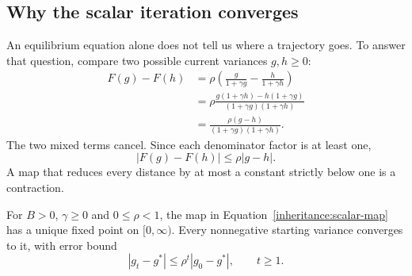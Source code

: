\subsection{Why the scalar iteration converges}
\label{inheritance:contraction}

An equilibrium equation alone does not tell us where a trajectory goes.
To answer that question, compare two possible current variances $g,h\geq0$:
\begin{align}
  F(g)-F(h)
    &=\rho\left(\frac{g}{1+\gamma g}
                      -\frac{h}{1+\gamma h}\right)\\
    &=\rho\frac{g(1+\gamma h)-h(1+\gamma g)}
                    {(1+\gamma g)(1+\gamma h)}\\
    &=\frac{\rho(g-h)}{(1+\gamma g)(1+\gamma h)}.
\end{align}
The two mixed terms cancel. Since each denominator factor is at least
one,
\begin{equation}
  |F(g)-F(h)|\leq\rho|g-h|.
  \label{inheritance:contraction-bound}
\end{equation}
A map that reduces every distance by at most a constant strictly below
one is a contraction.

\begin{proposition}
  \label{inheritance:scalar-convergence}
  For $B>0$, $\gamma\geq0$ and $0\leq\rho<1$, the map in
  Equation~\eqref{inheritance:scalar-map} has a unique fixed point on
  $[0,\infty)$. Every nonnegative starting variance converges to it,
  with error bound
  \begin{equation}
    |g_t-g^*|\leq\rho^t|g_0-g^*|,\qquad t\geq1.
    \label{inheritance:scalar-error-bound}
  \end{equation}
\end{proposition}

